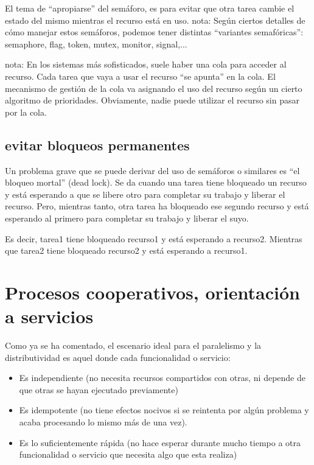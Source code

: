 \documentclass[spanish,12pt,a4paper,final,oneside]{book}
\begin{document}
El tema de ``apropiarse'' del semáforo, es para evitar que otra tarea cambie el estado del mismo mientras el recurso está en uso.
nota: Según ciertos detalles de cómo manejar estos semáforos, podemos tener distintas ``variantes semafóricas'': semaphore, flag, token, mutex, monitor, signal,...

nota: En los sistemas más sofisticados, suele haber una cola para acceder al recurso. Cada tarea que vaya a usar el recurso ``se apunta'' en la cola. El mecanismo de gestión de la cola va asignando el uso del recurso según un cierto algoritmo de prioridades. Obviamente, nadie puede utilizar el recurso sin pasar por la cola.

\subsection{evitar bloqueos permanentes}
Un problema grave que se puede derivar del uso de semáforos o similares es ``el bloqueo mortal'' (dead lock). Se da cuando una tarea tiene bloqueado un recurso y está esperando a que se libere otro para completar su trabajo y liberar el recurso. Pero, mientras tanto, otra tarea ha bloqueado ese segundo recurso y está esperando al primero para completar su trabajo y liberar el suyo.

Es decir, tarea1 tiene bloqueado recurso1 y está esperando a recurso2. Mientras que tarea2 tiene bloqueado recurso2 y está esperando a recurso1.



\section{Procesos cooperativos, orientación a servicios}

Como ya se ha comentado, el escenario ideal para el paralelismo y la distributividad es aquel donde cada funcionalidad o servicio:

\begin{itemize}

\item Es independiente (no necesita recursos compartidos con otras, ni depende de que otras se hayan ejecutado previamente) 

\item Es idempotente (no tiene efectos nocivos si se reintenta por algún problema y acaba procesando lo mismo más de una vez).

\item Es lo suficientemente rápida (no hace esperar durante mucho tiempo a otra funcionalidad o servicio que necesita algo que esta realiza)


\end{itemize}
\end{document}
